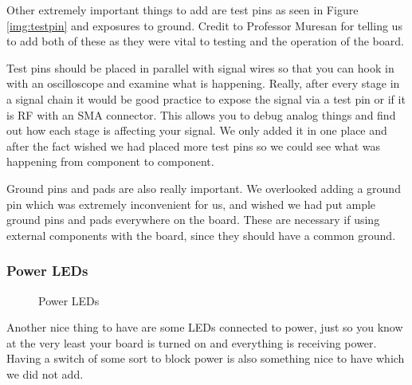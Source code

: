 Other extremely important things to add are test pins as seen in Figure \ref{img:testpin} and exposures to ground. Credit to
Professor Muresan for telling us to add both of these as they were vital to testing and the operation of the board.

Test pins should be placed in parallel with signal wires so that you can hook in with an oscilloscope and examine what is happening.
Really, after every stage in a signal chain it would be good practice to expose the signal via a test pin or if it is RF with an
SMA connector. This allows you to debug analog things and find out how each stage is affecting your signal. We only added it
in one place and after the fact wished we had placed more test pins so we could see what was happening from component to component.

Ground pins and pads are also really important. We overlooked adding a ground pin which was extremely inconvenient for us, and wished we
had put ample ground pins and pads everywhere on the board. These are necessary if using external components with the board, since
they should have a common ground.

\subsubsection{Power LEDs}
\begin{figure}[H]
  \centering
\caption{Power LEDs}
\label{img:led}
\end{figure}

Another nice thing to have are some LEDs connected to power, just so you know at the very least your board is turned on and everything
is receiving power. Having a switch of some sort to block power is also something nice to have which we did not add.

